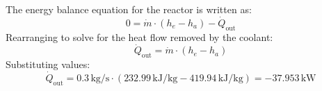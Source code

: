 The energy balance equation for the reactor is written as:  
\[
0 = \dot{m} \cdot (h_e - h_a) - \dot{Q}_{\text{out}}
\]  
Rearranging to solve for the heat flow removed by the coolant:  
\[
\dot{Q}_{\text{out}} = \dot{m} \cdot (h_e - h_a)
\]  
Substituting values:  
\[
\dot{Q}_{\text{out}} = 0.3 \, \text{kg/s} \cdot (232.99 \, \text{kJ/kg} - 419.94 \, \text{kJ/kg}) = -37.953 \, \text{kW}
\]